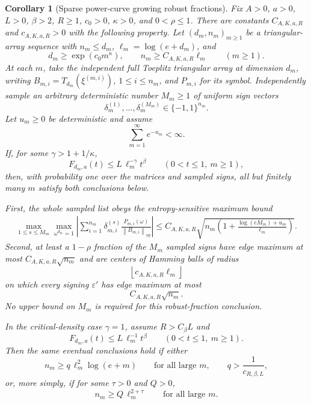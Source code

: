 \documentclass[11pt]{amsart}
\numberwithin{equation}{section}
\newtheorem{corollary}[theorem]{Corollary}
\theoremstyle{definition}
\theoremstyle{remark}
\newcommand{\op}{\mathrm{op}}
\newcommand{\norm}[1]{\left\lVert #1\right\rVert}
\newcommand{\eps}{\varepsilon}
\begin{document}
\begin{corollary}[Sparse power-curve growing robust fractions]
\label{cor:normalizer-tail-power-borel-window-growing-fractions}
Fix \(A>0\), \(a>0\), \(L>0\), \(\beta>2\), \(R\ge1\), \(c_0>0\),
\(\kappa>0\), and \(0<\rho\le1\).  There are constants
\(C_{A,K,a,R}\) and \(c_{A,K,a,R}>0\) with the following property.  Let
\((d_m,n_m)_{m\ge1}\) be a triangular-array sequence with \(n_m\le d_m\),
\(\ell_m=\log(e+d_m)\), and
\[
  d_m\ge \exp(c_0m^\kappa),\qquad
  n_m\ge C_{A,K,a,R}\ell_m
  \qquad(m\ge1).
\]
At each \(m\), take the independent full Toeplitz triangular array at dimension
\(d_m\), writing \(B_{m,i}=T_{d_m}(\xi^{(m,i)})\), \(1\le i\le n_m\), and
\(P_{m,i}\) for its symbol.  Independently sample an arbitrary deterministic
number \(M_m\ge1\) of uniform sign vectors
\[
  \delta_m^{(1)},\ldots,\delta_m^{(M_m)}\in\{-1,1\}^{n_m}.
\]
Let \(u_m\ge0\) be deterministic and assume
\[
  \sum_{m=1}^{\infty}e^{-u_m}<\infty .
\]
If, for some \(\gamma>1+1/\kappa\),
\[
  F_{d_m,a}(t)\le L\,\ell_m^{-\gamma}t^\beta
  \qquad(0<t\le1,\ m\ge1),
\]
then, with probability one over the matrices and sampled signs, all but
finitely many \(m\) satisfy both conclusions below.

First, the whole sampled list obeys the entropy-sensitive maximum bound
\[
\begin{aligned}
  \max_{1\le s\le M_m}\max_{\omega^{d_m}=1}
  \left|\sum_{i=1}^{n_m}\delta_{m,i}^{(s)}
  \frac{P_{m,i}(\omega)}{\norm{B_{m,i}}_{\op}}\right|
  \le
  C_{A,K,a,R}\sqrt{
    n_m\left(1+\frac{\log(eM_m)+u_m}{\ell_m}\right)} .
\end{aligned}
\]
Second, at least a \(1-\rho\) fraction of the \(M_m\) sampled signs have edge
maximum at most \(C_{A,K,a,R}\sqrt{n_m}\) and are centers of Hamming balls of
radius
\[
  \left\lfloor c_{A,K,a,R}\ell_m\right\rfloor
\]
on which every signing \(\eps'\) has edge maximum at most
\[
  C_{A,K,a,R}\sqrt{n_m}.
\]
No upper bound on \(M_m\) is required for this robust-fraction conclusion.

In the critical-density case \(\gamma=1\), assume \(R>C_\beta L\) and
\[
  F_{d_m,a}(t)\le L\,\ell_m^{-1}t^\beta
  \qquad(0<t\le1,\ m\ge1).
\]
Then the same eventual conclusions hold if either
\[
  n_m\ge q\,\ell_m^2\log(e+m)
  \qquad\text{for all large }m,\qquad
  q>\frac1{c_{R,\beta,L}},
\]
or, more simply, if for some \(\tau>0\) and \(Q>0\),
\[
  n_m\ge Q\,\ell_m^{2+\tau}
  \qquad\text{for all large }m .
\]
\end{corollary}
\end{document}
